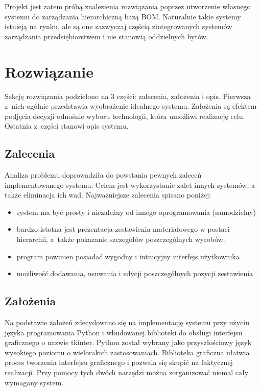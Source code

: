 \documentclass[12pt,twoside]{article}
\begin{document}
Projekt jest zatem próbą znalezienia rozwiązania poprzez utworzenie własnego systemu do zarządzania hierarchiczną bazą BOM. Naturalnie takie systemy istnieją na rynku, ale są one zazwyczaj częścią zintegrowanych systemów zarządzania przedsiębiorstwem i nie stanowią oddzielnych bytów.

\clearpage
\section{Rozwiązanie}

Sekcję rozwiązania podzielono na 3 części: zalecenia, założenia i opis. Pierwsza z~nich ogólnie przedstawia wyobrażenie idealnego systemu. Założenia są efektem podjęcia decyzji odnośnie wyboru technologii, która umożliwi realizację celu. Ostatnia z~części stanowi opis systemu.

\subsection*{Zalecenia}
Analiza problemu doprowadziła do powstania pewnych zaleceń implementowanego systemu. Celem jest wykorzystanie zalet innych systemów, a także eliminacja ich wad. Najważniejsze zalecenia spisano poniżej:

\begin{itemize}[label=-,labelsep=0.4cm,leftmargin=0.6cm]
\item system ma być prosty i niezależny od innego oprogramowania (samodzielny)
\item bardzo istotna jest prezentacja zestawienia materiałowego w postaci hierarchii, a~także pokazanie szczegółów poszczególnych wyrobów. 
\item program powinien posiadać wygodny i intuicyjny interfejs użytkownika
\item możliwość dodawania, usuwania i edycji poszczególnych pozycji zestawienia
\end{itemize}

\subsection*{Założenia}
Na podstawie założeń zdecydowano się na implementację systemu przy użyciu języka programowania Python i wbudowanej biblioteki do obsługi interfejsu graficznego o nazwie tkinter. Python został wybrany jako  przyszłościowy język wysokiego poziomu o wielorakich zastosowaniach. Biblioteka graficzna ułatwia proces tworzenia interfejsu graficznego i pozwala się skupić na faktycznej realizacji. Przy pomocy tych dwóch narzędzi można zorganizować niemal cały wymagany system.
\end{document}
